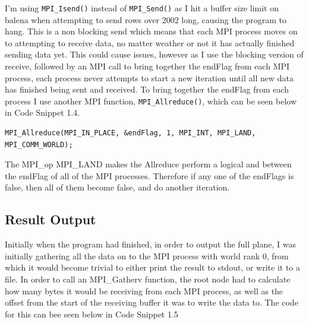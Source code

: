 \documentclass{report}
\begin{document}
I'm using \lstinline[style=customc]|MPI_Isend()| instead of \lstinline[style=customc]|MPI_Send()| as I hit a buffer size limit on balena when attempting to send rows over 2002 long, causing the program to hang. This is a non blocking send which means that each MPI process moves on to attempting to receive data, no matter weather or not it has actually finished sending data yet. This could cause issues, however as I use the blocking version of receive, followed by an MPI call to bring together the endFlag from each MPI process, each process never attempts to start a new iteration until all new data has finished being sent and received. To bring together the endFlag from each process I use another MPI function, \lstinline[style=customc]|MPI_Allreduce()|, which can be seen below in Code Snippet 1.4.

\begin{lstlisting}[style=customc,caption=MPI Communication]
    MPI_Allreduce(MPI_IN_PLACE, &endFlag, 1, MPI_INT, MPI_LAND, MPI_COMM_WORLD);
\end{lstlisting}

The MPI\_op MPI\_LAND makes the Allreduce perform a logical and between the endFlag of all of the MPI processes. Therefore if any one of the endFlags is false, then all of them become false, and do another iteration.

\subsection{Result Output}
Initially when the program had finished, in order to output the full plane, I was initially gathering all the data on to the MPI process with world rank 0, from which it would become trivial to either print the result to stdout, or write it to a file. In order to call an MPI\_Gatherv function, the root node had to calculate how many bytes it would be receiving from each MPI process, as well as the offset from the start of the receiving buffer it was to write the data to. The code for this can bee seen below in Code Snippet 1.5
\end{document}

